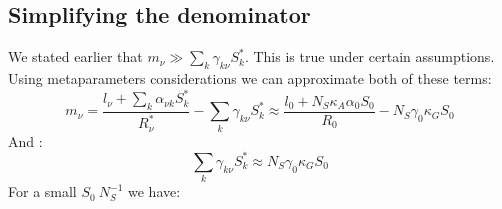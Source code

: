 \documentclass[12pt, titlepage, twoside, openright]{report}
\begin{document}
  \subsection{Simplifying the denominator}
  We stated earlier that $m_\nu \gg \sum_k \gamma_{k\nu}S^*_k$. This is true under certain assumptions. Using metaparameters considerations we can approximate both of these terms:
  \begin{equation}
  m_\nu = \frac{l_\nu + \sum_k \alpha_{\nu k}S^*_k}{R^*_\nu}-\sum_k \gamma_{k\nu} S^*_k \approx \frac{l_0 + N_S \kappa_A \alpha_0 S_0}{R_0} - N_S \gamma_0 \kappa_G S_0
  \end{equation}
  And :
  \begin{equation}
  \sum_k \gamma_{k\nu}S^*_k \approx N_S \gamma_0 \kappa_G S_0
  \end{equation}
  For a small $S_0 ~ N_S^{-1}$ we have:
  \begi
  \printbibliography
\end{document}
